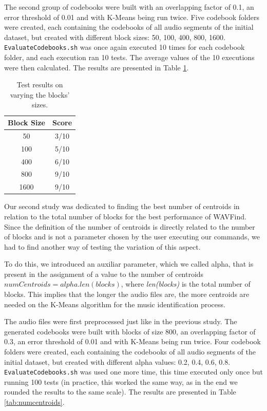 \documentclass[12pt]{article}
\begin{document}
The second group of codebooks were built with an overlapping factor of 0.1, an 
error threshold of 0.01 and with K-Means being run twice.
Five codebook folders were created, each containing the codebooks of all audio
segments of the initial dataset, but created with different block sizes:
50, 100, 400, 800, 1600. 
\texttt{EvaluateCodebooks.sh} was once again executed 10 times for each codebook
folder, and each execution ran 10 tests.
The average values of the 10 executions were then calculated.
The results are presented in Table \ref{tab:blockSize}.

\begin{table}[H]
  \begin{center}
    \begin{tabular}{c|c}
      \textbf{Block Size} & \textbf{Score}\\
      \hline
      50 & 3/10\\
      100 & 5/10\\
      400 & 6/10\\
      800 & 9/10\\
      1600 & 9/10\\
    \end{tabular}
  \end{center}
  \caption{Test results on varying the blocks' sizes.}
  \label{tab:blockSize}
\end{table}

Our second study was dedicated to finding the best number of centroids in relation
to the total number of blocks for the best performance of WAVFind.
Since the definition of the number of centroids is directly related to the number
of blocks and is not a parameter chosen by the user executing our commands,
we had to find another way of testing the variation of this aspect.

To do this, we introduced an auxiliar parameter, which we called alpha, that is 
present in the assignment of a value to the number of centroids 
$numCentroids = alpha . len(blocks)$, where {\it len(blocks)\/} is the total 
number of blocks.
This implies that the longer the audio files are, the more centroids are needed
on the K-Means algorithm for the music identification process.

The audio files were first preprocessed just like in the previous study.
The generated codebooks were built with blocks of size 800, an overlapping 
factor of 0.3, an error threshold of 0.01 and with K-Means being run twice.
Four codebook folders were created, each containing the codebooks of all audio
segments of the initial dataset, but created with different alpha values:
0.2, 0.4, 0.6, 0.8.
\texttt{EvaluateCodebooks.sh} was used one more time, this time executed only 
once but running 100 tests (in practice, this worked the same way, as in the end 
we rounded the results to the same scale).
The results are presented in Table \ref{tab:numcentroids}.
\end{document}
